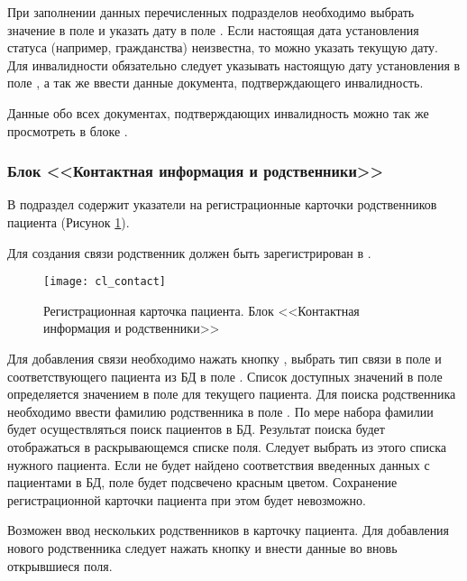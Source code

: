 При заполнении данных перечисленных подразделов необходимо выбрать значение в поле  и указать дату в поле . Если настоящая дата установления статуса (например, гражданства) неизвестна, то можно указать текущую дату. Для инвалидности обязательно следует указывать настоящую дату установления в поле , а так же ввести данные документа, подтверждающего инвалидность.


\begin{prim}
Данные обо всех документах, подтверждающих инвалидность можно так же просмотреть в блоке .
\end{prim}
 
\subsubsection{Блок <<Контактная информация и родственники>>}

В подраздел  содержит указатели на регистрационные карточки родственников пациента (Рисунок \ref{img_cl_contact}). 

\begin{vnim}
Для создания связи родственник должен быть зарегистрирован в \tmis.
\end{vnim}

\begin{figure}[ht!]\centering
 \texttt{[image: cl\_contact]}
 \caption{Регистрационная карточка пациента. Блок <<Контактная информация и родственники>>}
 \label{img_cl_contact}
\end{figure} 

Для добавления связи необходимо нажать кнопку , выбрать тип связи в поле  и соответствующего пациента из БД в поле . Список доступных значений в поле  определяется значением в поле  для текущего пациента. Для поиска родственника необходимо ввести фамилию родственника в поле . По мере набора фамилии будет осуществляться поиск пациентов в БД. Результат поиска будет отображаться в раскрывающемся списке поля. Следует выбрать из этого списка нужного пациента. Если не будет найдено соответствия введенных данных с пациентами в БД, поле  будет подсвечено красным цветом. Сохранение регистрационной карточки пациента при этом будет невозможно.

Возможен ввод нескольких родственников в карточку пациента. Для добавления нового родственника следует нажать кнопку  и внести данные во вновь открывшиеся поля.

